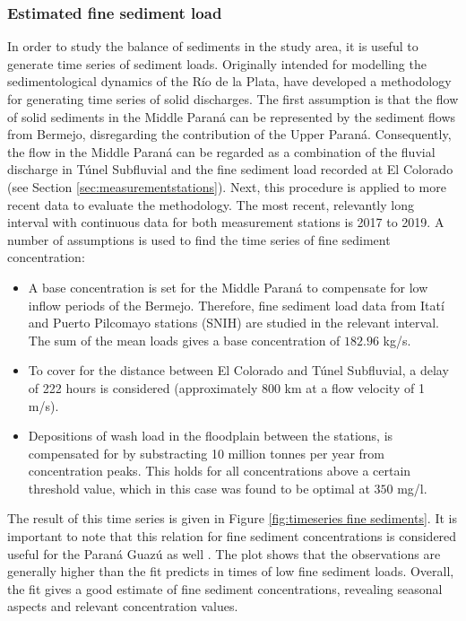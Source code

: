 \subsubsection{Estimated fine sediment load}
In order to study the balance of sediments in the study area, it is useful to generate time series of sediment loads. Originally intended for modelling the sedimentological dynamics of the Río de la Plata, \citeauthor{reMetodologiaParaGeneracion2009} have developed a methodology for generating time series of solid discharges. The first assumption is that the flow of solid sediments in the Middle Paraná can be represented by the sediment flows from Bermejo, disregarding the contribution of the Upper Paraná. Consequently, the flow in the Middle Paraná can be regarded as a combination of the fluvial discharge in Túnel Subfluvial and the fine sediment load recorded at El Colorado (see Section \ref{sec:measurementstations}). Next, this procedure is applied to more recent data to evaluate the methodology. The most recent, relevantly long interval with continuous data for both measurement stations is 2017 to 2019. A number of assumptions is used to find the time series of fine sediment concentration:

\begin{itemize}
    \item A base concentration is set for the Middle Paraná to compensate for low inflow periods of the Bermejo. Therefore, fine sediment load data from Itatí and Puerto Pilcomayo stations (SNIH) are studied in the relevant interval. The sum of the mean loads gives a base concentration of $182.96$ kg/s.
    \item To cover for the distance between El Colorado and Túnel Subfluvial, a delay of 222 hours is considered (approximately 800 km at a flow velocity of 1 m/s). 
    \item Depositions of wash load in the floodplain between the stations, is compensated for by substracting 10 million tonnes per year from concentration peaks. This holds for all concentrations above a certain threshold value, which in this case was found to be optimal at $350$ mg/l.
\end{itemize}

The result of this time series is given in Figure \ref{fig:timeseries fine sediments}. It is important to note that this relation for fine sediment concentrations is considered useful for the Paraná Guazú as well \autocite{reMetodologiaParaGeneracion2009}. The plot shows that the observations are generally higher than the fit predicts in times of low fine sediment loads. Overall, the fit gives a good estimate of fine sediment concentrations, revealing seasonal aspects and relevant concentration values.

